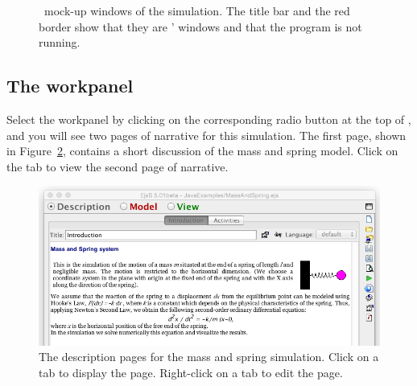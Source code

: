 \begin{figure}[htb]
  \caption{\ejs\ mock-up windows of the  simulation. The title bar and the red border show that they are \ejs' windows
  and that the program is not running.}
  \label{fig:02ExplorationJava/SpringInterface}
\end{figure}


\subsection{The  workpanel}

Select the  workpanel by clicking on the corresponding radio button at the top of
\ejs, and you will see two pages of narrative for this simulation. The first page, shown in
Figure~\ref{fig:02ExplorationJava/SpringDesc}, contains a short discussion of the mass and spring model. Click on the
 tab to view the second page of narrative.

\begin{figure}[htb]
  \centering
  \includegraphics[scale=\scale]{02ExplorationJava/images/SpringDesc.png}
  \caption{The description pages for the mass and spring simulation. Click on a tab to display the page. Right-click on a tab to edit the page.}
  \label{fig:02ExplorationJava/SpringDesc}
\end{figure}

